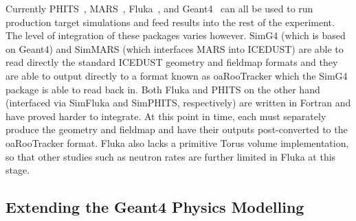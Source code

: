 Currently PHITS~\cite{PHITS2002}, MARS~\cite{MARS1995}, Fluka~\cite{FLUKA2005}, and Geant4~\cite{Geant42003} can all be used to run production target simulations and feed results into the rest of the experiment.
The level of integration of these packages varies however.
SimG4 (which is based on Geant4) and SimMARS (which interfaces MARS into ICEDUST) are able to read directly the standard ICEDUST geometry and fieldmap formats and they are able to output directly to a format known as oaRooTracker which the SimG4 package is able to read back in.
Both Fluka and PHITS  on the other hand (interfaced via SimFluka and SimPHITS, respectively) are written in Fortran and have proved harder to integrate. 
At this point in time, each must separately produce the geometry and fieldmap and have their outputs post-converted to the oaRooTracker format.  
Fluka also lacks a primitive Torus volume implementation, so that other studies such as neutron rates are further limited in Fluka at this stage.

\subsection{Extending the Geant4 Physics Modelling}


